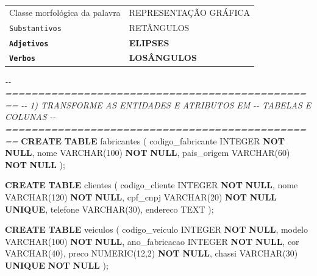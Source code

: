 \documentclass[
]{book}
\makeatletter
\newenvironment{Shaded}{\begin{snugshade}}{\end{snugshade}}
\newcommand{\CommentTok}[1]{\textcolor[rgb]{0.56,0.35,0.01}{\textit{#1}}}
\newcommand{\DataTypeTok}[1]{\textcolor[rgb]{0.13,0.29,0.53}{#1}}
\newcommand{\DecValTok}[1]{\textcolor[rgb]{0.00,0.00,0.81}{#1}}
\newcommand{\KeywordTok}[1]{\textcolor[rgb]{0.13,0.29,0.53}{\textbf{#1}}}
\newcommand{\NormalTok}[1]{#1}
\newcommand*\pandocbounded[1]{%
  \sbox\pandoc@box{#1}%
  \Gscale@div\@tempa{\textheight}{\dimexpr\ht\pandoc@box+\dp\pandoc@box\relax}%
  \Gscale@div\@tempb{\linewidth}{\wd\pandoc@box}%
  \ifdim\@tempb\p@<\@tempa\p@\let\@tempa\@tempb\fi%
  \ifdim\@tempa\p@<\p@\scalebox{\@tempa}{\usebox\pandoc@box}%
  \else\usebox{\pandoc@box}%
  \fi%
}
\makeatother
\begin{document}
\begin{longtable}[]{@{}ll@{}}
\toprule\noalign{}
\endhead
\bottomrule\noalign{}
\endlastfoot
Classe morfológica da palavra & REPRESENTAÇÃO GRÁFICA \\
\texttt{Substantivos} & RETÂNGULOS \\
\textbf{\texttt{Adjetivos}} & \textbf{ELIPSES} \\
\textbf{\texttt{Verbos}} & \textbf{LOSÂNGULOS} \\
\end{longtable}

\pandocbounded{}

\begin{Shaded}
\begin{Highlighting}[]


\CommentTok{{-}{-} ================================================}
\CommentTok{{-}{-} 1) TRANSFORME AS ENTIDADES E ATRIBUTOS EM }
\CommentTok{{-}{-}    TABELAS E COLUNAS}
\CommentTok{{-}{-} ================================================}
\KeywordTok{CREATE} \KeywordTok{TABLE}\NormalTok{ fabricantes}
\NormalTok{(}
\NormalTok{    codigo\_fabricante  }\DataTypeTok{INTEGER}      \KeywordTok{NOT} \KeywordTok{NULL}\NormalTok{,}
\NormalTok{    nome               }\DataTypeTok{VARCHAR}\NormalTok{(}\DecValTok{100}\NormalTok{) }\KeywordTok{NOT} \KeywordTok{NULL}\NormalTok{,}
\NormalTok{    pais\_origem        }\DataTypeTok{VARCHAR}\NormalTok{(}\DecValTok{60}\NormalTok{)  }\KeywordTok{NOT} \KeywordTok{NULL}
\NormalTok{);}

\KeywordTok{CREATE} \KeywordTok{TABLE}\NormalTok{ clientes}
\NormalTok{(}
\NormalTok{    codigo\_cliente   }\DataTypeTok{INTEGER}      \KeywordTok{NOT} \KeywordTok{NULL}\NormalTok{,}
\NormalTok{    nome             }\DataTypeTok{VARCHAR}\NormalTok{(}\DecValTok{120}\NormalTok{) }\KeywordTok{NOT} \KeywordTok{NULL}\NormalTok{,}
\NormalTok{    cpf\_cnpj         }\DataTypeTok{VARCHAR}\NormalTok{(}\DecValTok{20}\NormalTok{)  }\KeywordTok{NOT} \KeywordTok{NULL} \KeywordTok{UNIQUE}\NormalTok{,}
\NormalTok{    telefone         }\DataTypeTok{VARCHAR}\NormalTok{(}\DecValTok{30}\NormalTok{),}
\NormalTok{    endereco         TEXT}
\NormalTok{);}

\KeywordTok{CREATE} \KeywordTok{TABLE}\NormalTok{ veiculos }
\NormalTok{(}
\NormalTok{    codigo\_veiculo      }\DataTypeTok{INTEGER}       \KeywordTok{NOT} \KeywordTok{NULL}\NormalTok{,}
\NormalTok{    modelo              }\DataTypeTok{VARCHAR}\NormalTok{(}\DecValTok{100}\NormalTok{)  }\KeywordTok{NOT} \KeywordTok{NULL}\NormalTok{,}
\NormalTok{    ano\_fabricacao      }\DataTypeTok{INTEGER}       \KeywordTok{NOT} \KeywordTok{NULL}\NormalTok{,}
\NormalTok{    cor                 }\DataTypeTok{VARCHAR}\NormalTok{(}\DecValTok{40}\NormalTok{),}
\NormalTok{    preco               }\DataTypeTok{NUMERIC}\NormalTok{(}\DecValTok{12}\NormalTok{,}\DecValTok{2}\NormalTok{) }\KeywordTok{NOT} \KeywordTok{NULL}\NormalTok{,}
\NormalTok{    chassi              }\DataTypeTok{VARCHAR}\NormalTok{(}\DecValTok{30}\NormalTok{)   }\KeywordTok{UNIQUE} \KeywordTok{NOT} \KeywordTok{NULL}
\NormalTok{);}


\end{Highlighting}
\end{Shaded}
\end{document}
